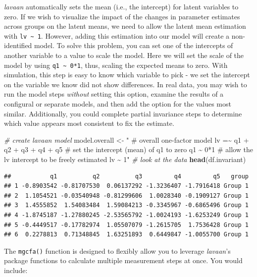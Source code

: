 \documentclass[
  man]{apa7}
\newenvironment{Shaded}{\begin{snugshade}}{\end{snugshade}}
\newcommand{\CommentTok}[1]{\textcolor[rgb]{0.56,0.35,0.01}{\textit{#1}}}
\newcommand{\FunctionTok}[1]{\textcolor[rgb]{0.13,0.29,0.53}{\textbf{#1}}}
\newcommand{\NormalTok}[1]{#1}
\newcommand{\OtherTok}[1]{\textcolor[rgb]{0.56,0.35,0.01}{#1}}
\newcommand{\StringTok}[1]{\textcolor[rgb]{0.31,0.60,0.02}{#1}}
\begin{document}
\emph{lavaan} automatically sets the mean (i.e., the intercept) for latent variables to zero. If we wish to visualize the impact of the changes in parameter estimates across groups on the latent means, we need to allow the latent mean estimation with \texttt{lv\ \textasciitilde{}\ 1}. However, adding this estimation into our model will create a non-identified model. To solve this problem, you can set one of the intercepts of another variable to a value to scale the model. Here we will set the scale of the model by using \texttt{q1\ \textasciitilde{}\ 0*1}, thus, scaling the expected means to zero. With simulation, this step is easy to know which variable to pick - we set the intercept on the variable we know did not show differences. In real data, you may wish to run the model steps \emph{without} setting this option, examine the results of a configural or separate models, and then add the option for the values most similar. Additionally, you could complete partial invariance steps to determine which value appears most consistent to fix the estimate.

\small

\begin{Shaded}
\begin{Highlighting}[]
\CommentTok{\# create lavaan model}
\NormalTok{model.overall }\OtherTok{\textless{}{-}} \StringTok{"}
\StringTok{\# overall one{-}factor model}
\StringTok{lv =\textasciitilde{} q1 + q2 + q3 + q4 + q5}
\StringTok{\# set the intercept (mean) of q1 to zero}
\StringTok{q1 \textasciitilde{} 0*1}
\StringTok{\# allow the lv intercept to be freely estimated}
\StringTok{lv \textasciitilde{} 1"}
\CommentTok{\# look at the data}
\FunctionTok{head}\NormalTok{(df.invariant)}
\end{Highlighting}
\end{Shaded}

\normalsize

\begin{verbatim}
##           q1          q2          q3         q4         q5   group
## 1 -0.8903542 -0.81707530  0.06137292 -1.3236407 -1.7916418 Group 1
## 2  1.1054521 -0.03540948 -0.81299606  1.0028340 -0.1909127 Group 1
## 3  1.4555852  1.54083484  1.59084213 -0.3345967 -0.6865496 Group 1
## 4 -1.8745187 -1.27880245 -2.53565792 -1.0024193 -1.6253249 Group 1
## 5 -0.4449517 -0.17782974  1.05507079 -1.2615705  1.7536428 Group 1
## 6  0.2278813  0.71348845  1.63251893  0.6449847 -1.0055700 Group 1
\end{verbatim}

The \texttt{mgcfa()} function is designed to flexibly allow you to leverage \emph{lavaan}'s package functions to calculate multiple measurement steps at once. You would include:
\end{document}
